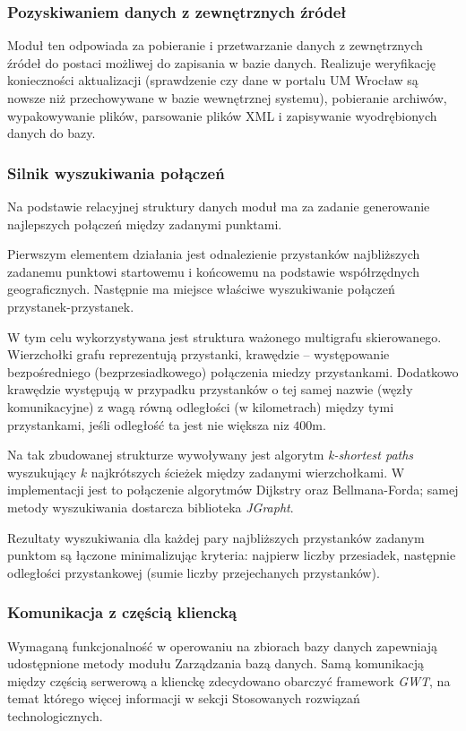 \documentclass[a4paper,12pt]{article}
\begin{document}
\subsubsection{Pozyskiwaniem danych z zewnętrznych źródeł}
Moduł ten odpowiada za pobieranie i przetwarzanie danych z zewnętrznych źródeł
do postaci możliwej do zapisania w bazie danych. Realizuje weryfikację
konieczności aktualizacji (sprawdzenie czy dane w portalu UM Wrocław są nowsze
niż przechowywane w bazie wewnętrznej systemu), pobieranie archiwów,
wypakowywanie plików, parsowanie plików XML i zapisywanie wyodrębionych danych
do bazy.
 

\subsubsection{Silnik wyszukiwania połączeń}
Na podstawie relacyjnej struktury danych moduł ma za zadanie generowanie
najlepszych połączeń między zadanymi punktami.

Pierwszym elementem działania jest odnalezienie przystanków najbliższych
zadanemu punktowi startowemu i końcowemu na podstawie współrzędnych
geograficznych. Następnie ma miejsce właściwe wyszukiwanie połączeń
przystanek-przystanek.

W tym celu wykorzystywana jest struktura ważonego multigrafu skierowanego.
Wierzchołki grafu reprezentują przystanki,  krawędzie -- występowanie
bezpośredniego (bezprzesiadkowego) połączenia miedzy przystankami. Dodatkowo
krawędzie występują w przypadku przystanków o tej samej nazwie (węzły
komunikacyjne) z wagą równą odległości (w kilometrach) między tymi
przystankami, jeśli odległość ta jest nie większa niz $400$m. 

Na tak zbudowanej strukturze wywoływany jest algorytm \emph{k-shortest paths}
wyszukujący $k$ najkrótszych ścieżek między zadanymi wierzchołkami. W
implementacji jest to połączenie algorytmów Dijkstry oraz
Bellmana-Forda; samej metody wyszukiwania dostarcza biblioteka \emph{JGrapht}.

Rezultaty wyszukiwania dla każdej pary najbliższych przystanków zadanym punktom
są łączone minimalizując kryteria: najpierw liczby przesiadek, następnie
odległości przystankowej (sumie liczby przejechanych przystanków).


\subsubsection{Komunikacja z częścią kliencką}
 Wymaganą funkcjonalność w operowaniu na zbiorach bazy danych zapewniają
 udostępnione metody modułu Zarządzania bazą danych. Samą komunikacją między
 częścią serwerową a klienckę zdecydowano obarczyć framework \emph{GWT}, na
 temat którego więcej informacji w sekcji Stosowanych rozwiązań technologicznych.
\end{document}
